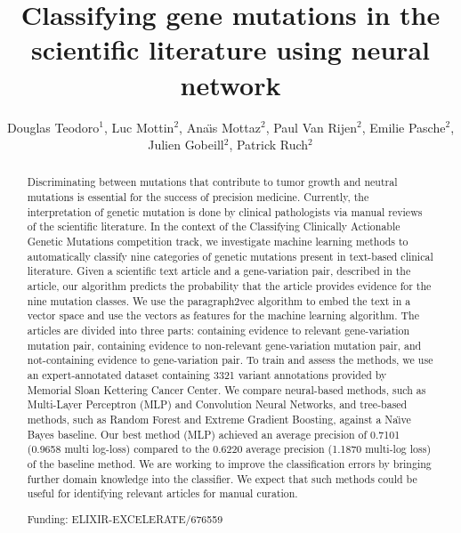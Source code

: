 \documentclass[twoside]{article}
\title{\vspace{-15mm}\fontsize{24pt}{10pt}\selectfont\textbf{Classifying gene mutations in the scientific literature using neural network}} %
\author{Douglas Teodoro$^1$, Luc Mottin$^2$, Ana\"{\i}s Mottaz$^2$, Paul Van Rijen$^2$, Emilie Pasche$^2$, Julien Gobeill$^2$, Patrick Ruch$^2$}
\affil{1 SIB SWISS INSTITUTE OF BIOINFORMATICS\\ 2 HES-SO/HEG GENEVA\\ }
\date{}
\begin{document}
\maketitle %

\thispagestyle{fancy} %


\begin{abstract}
Discriminating between mutations that contribute to tumor growth and neutral mutations is essential for the success of precision medicine. Currently, the interpretation of genetic mutation is done by clinical pathologists via manual reviews of the scientific literature. In the context of the Classifying Clinically Actionable Genetic Mutations competition track, we investigate machine learning methods to automatically classify nine categories of genetic mutations present in text-based clinical literature. Given a scientific text article and a gene-variation pair, described in the article, our algorithm predicts the probability that the article provides evidence for the nine mutation classes. We use the paragraph2vec algorithm to embed the text in a vector space and use the vectors as features for the machine learning algorithm. The articles are divided into three parts: containing evidence to relevant gene-variation mutation pair, containing evidence to non-relevant gene-variation mutation pair, and not-containing evidence to gene-variation pair. To train and assess the methods, we use an expert-annotated dataset containing 3321 variant annotations provided by Memorial Sloan Kettering Cancer Center. We compare neural-based methods, such as Multi-Layer Perceptron (MLP) and Convolution Neural Networks, and tree-based methods, such as Random Forest and Extreme Gradient Boosting, against a Na\"{\i}ve Bayes baseline. Our best method (MLP) achieved an average precision of 0.7101 (0.9658 multi log-loss) compared to the 0.6220 average precision (1.1870 multi-log loss) of the baseline method. We are working to improve the classification errors by bringing further domain knowledge into the classifier. We expect that such methods could be useful for identifying relevant articles for manual curation.

Funding: ELIXIR-EXCELERATE/676559
\end{abstract}
\end{document}
